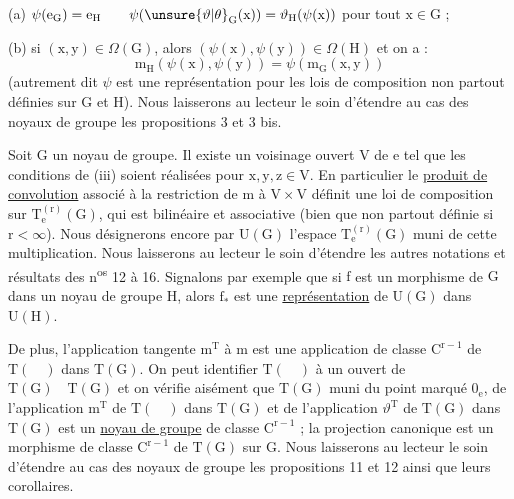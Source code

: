 (a) $\psi(\mathrm e_{\mathrm G})=\mathrm e_{\mathrm H}\qquad\psi(\unsure{\vartheta|\theta}_{\mathrm G}(\mathrm x))=\vartheta_{\mathrm H}(\psi(\mathrm x))$ pour tout $\mathrm x\in\mathrm G$ ;

(b) si $(\mathrm x,\mathrm y)\in\Omega(\mathrm G)$, alors $(\psi(\mathrm x),\psi(\mathrm y))\in\Omega(\mathrm H)$ et on a :
\[
\mathrm m_{\mathrm H}(\psi(\mathrm x),\psi(\mathrm y))=\psi(\mathrm m_{\mathrm G}(\mathrm x,\mathrm y))
\]
(autrement dit $\psi$ est une représentation pour les lois de composition non partout définies sur $\mathrm G$ et $\mathrm H$). Nous laisserons au lecteur le soin d'étendre au cas des noyaux de groupe les propositions 3 et 3 bis.

Soit $\mathrm G$ un noyau de groupe. Il existe un voisinage ouvert $\mathrm V$ de $\mathrm e$ tel que les conditions de (iii) soient réalisées pour $\mathrm x,\mathrm y,\mathrm z\in\mathrm V$. En particulier le \uline{produit de convolution} associé à la restriction de $\mathrm m$ à $\mathrm V\times\mathrm V$ définit une loi de composition sur $\mathrm T_{\mathrm e}^{(\mathrm r)}(\mathrm G)$, qui est bilinéaire et associative (bien que non partout définie si $\mathrm r<\infty$). Nous désignerons encore par $\mathrm U(\mathrm G)$ l'espace $\mathrm T_{\mathrm e}^{(\mathrm r)}(\mathrm G)$ muni de cette multiplication. Nous laisserons au lecteur le soin d'étendre les autres notations et résultats des n\textsuperscript{os} 12 à 16. Signalons par exemple que si $\mathrm f$ est un morphisme de $\mathrm G$ dans un noyau de groupe $\mathrm H$, alors $\mathrm f_{*}$ est une \uline{représentation} de $\mathrm U(\mathrm G)$ dans $\mathrm U(\mathrm H)$.

De plus, l'application tangente $\mathrm m^{\mathrm T}$ à $\mathrm m$ est une application de classe $\mathrm C^{\mathrm r-1}$ de $\mathrm T(\quad)$ dans $\mathrm T(\mathrm G)$. On peut identifier $\mathrm T(\quad)$ à un ouvert de $\mathrm T(\mathrm G)\quad\mathrm T(\mathrm G)$ et on vérifie aisément que $\mathrm T(\mathrm G)$ muni du point marqué $0_{\mathrm e}$, de l'application $\mathrm m^{\mathrm T}$ de $\mathrm T(\quad)$ dans $\mathrm T(\mathrm G)$ et de l'application $\vartheta^{\mathrm T}$ de $\mathrm T(\mathrm G)$ dans $\mathrm T(\mathrm G)$ est un \uline{noyau de groupe} de classe $\mathrm C^{\mathrm r-1}$ ; la projection canonique est un morphisme de classe $\mathrm C^{\mathrm r-1}$ de $\mathrm T(\mathrm G)$ sur $\mathrm G$. Nous laisserons au lecteur le soin d'étendre au cas des noyaux de groupe les propositions 11 et 12 ainsi que leurs corollaires.

